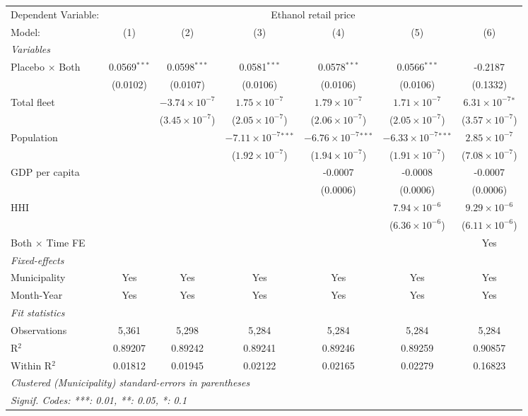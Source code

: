 \documentclass[
]{article}
\begin{document}
\begin{tabular}{lcccccc}
\tabularnewline\midrule\midrule
Dependent Variable:&\multicolumn{6}{c}{Ethanol retail price}\\
Model:&(1) & (2) & (3) & (4) & (5) & (6)\\
\midrule \emph{Variables}&   &   &   &   &   &  \\
Placebo $\times $ Both & 0.0569$^{***}$ & 0.0598$^{***}$ & 0.0581$^{***}$ & 0.0578$^{***}$ & 0.0566$^{***}$ & -0.2187\\
  &(0.0102) & (0.0107) & (0.0106) & (0.0106) & (0.0106) & (0.1332)\\
Total fleet &    & $-3.74\times 10^{-7}$ & $1.75\times 10^{-7}$ & $1.79\times 10^{-7}$ & $1.71\times 10^{-7}$ & $6.31\times 10^{-7}$$^{*}$\\
  &   & ($3.45\times 10^{-7}$) & ($2.05\times 10^{-7}$) & ($2.06\times 10^{-7}$) & ($2.05\times 10^{-7}$) & ($3.57\times 10^{-7}$)\\
Population &    &    & $-7.11\times 10^{-7}$$^{***}$ & $-6.76\times 10^{-7}$$^{***}$ & $-6.33\times 10^{-7}$$^{***}$ & $2.85\times 10^{-7}$\\
  &   &    & ($1.92\times 10^{-7}$) & ($1.94\times 10^{-7}$) & ($1.91\times 10^{-7}$) & ($7.08\times 10^{-7}$)\\
GDP per capita &    &    &    & -0.0007 & -0.0008 & -0.0007\\
  &   &    &    & (0.0006) & (0.0006) & (0.0006)\\
HHI &    &    &    &    & $7.94\times 10^{-6}$ & $9.29\times 10^{-6}$\\
  &   &    &    &    & ($6.36\times 10^{-6}$) & ($6.11\times 10^{-6}$)\\
Both $\times$ Time FE &  &  &  &  &  & Yes\\
\midrule \emph{Fixed-effects}&   &   &   &   &   &  \\
Municipality & Yes & Yes & Yes & Yes & Yes & Yes\\
Month-Year & Yes & Yes & Yes & Yes & Yes & Yes\\
\midrule \emph{Fit statistics}&  & & & & & \\
Observations & 5,361&5,298&5,284&5,284&5,284&5,284\\
R$^2$ & 0.89207&0.89242&0.89241&0.89246&0.89259&0.90857\\
Within R$^2$ & 0.01812&0.01945&0.02122&0.02165&0.02279&0.16823\\
\midrule\midrule\multicolumn{7}{l}{\emph{Clustered (Municipality) standard-errors in parentheses}}\\
\multicolumn{7}{l}{\emph{Signif. Codes: ***: 0.01, **: 0.05, *: 0.1}}\\
\end{tabular}
\end{document}
